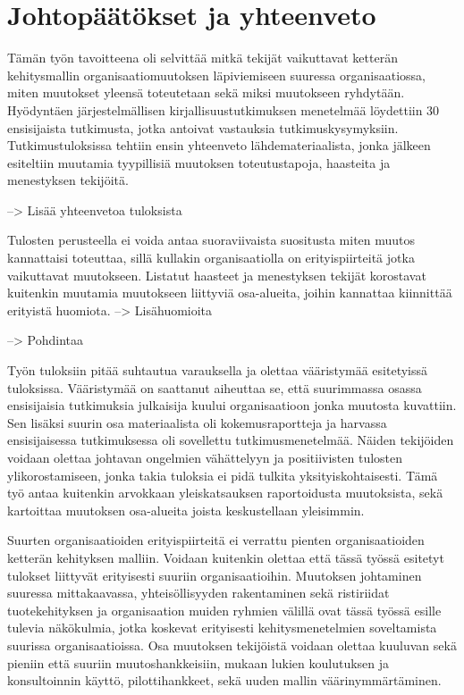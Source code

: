 \clearpage
\section{Johtopäätökset ja yhteenveto}
\label{sec:johtopaatokset}

Tämän työn tavoitteena oli selvittää mitkä tekijät vaikuttavat ketterän
kehitysmallin organisaatiomuutoksen läpiviemiseen suuressa organisaatiossa,
miten muutokset yleensä toteutetaan sekä miksi muutokseen ryhdytään. Hyödyntäen
järjestelmällisen kirjallisuustutkimuksen menetelmää löydettiin 30 ensisijaista
tutkimusta, jotka antoivat vastauksia tutkimuskysymyksiin. Tutkimustuloksissa
tehtiin ensin yhteenveto lähdemateriaalista, jonka jälkeen esiteltiin muutamia
tyypillisiä muutoksen toteutustapoja, haasteita ja menestyksen tekijöitä.

--> Lisää yhteenvetoa tuloksista

Tulosten perusteella ei voida antaa suoraviivaista suositusta miten muutos
kannattaisi toteuttaa, sillä kullakin organisaatiolla on erityispiirteitä jotka
vaikuttavat muutokseen. Listatut haasteet ja menestyksen tekijät korostavat
kuitenkin muutamia muutokseen liittyviä osa-alueita, joihin kannattaa kiinnittää
erityistä huomiota.
--> Lisähuomioita

--> Pohdintaa

Työn tuloksiin pitää suhtautua varauksella ja olettaa vääristymää esitetyissä
tuloksissa. Vääristymää on saattanut aiheuttaa se, että suurimmassa osassa
ensisijaisia tutkimuksia julkaisija kuului organisaatioon jonka muutosta
kuvattiin. Sen lisäksi suurin osa materiaalista oli kokemusraportteja ja
harvassa ensisijaisessa tutkimuksessa oli sovellettu tutkimusmenetelmää. Näiden
tekijöiden voidaan olettaa johtavan ongelmien vähättelyyn ja positiivisten
tulosten ylikorostamiseen, jonka takia tuloksia ei pidä tulkita
yksityiskohtaisesti. Tämä työ antaa kuitenkin arvokkaan yleiskatsauksen
raportoidusta muutoksista, sekä kartoittaa muutoksen osa-alueita joista
keskustellaan yleisimmin.

Suurten organisaatioiden erityispiirteitä ei verrattu pienten organisaatioiden
ketterän kehityksen malliin. Voidaan kuitenkin olettaa että tässä työssä
esitetyt tulokset liittyvät erityisesti suuriin organisaatioihin. Muutoksen
johtaminen suuressa mittakaavassa, yhteisöllisyyden rakentaminen sekä
ristiriidat tuotekehityksen ja organisaation muiden ryhmien välillä ovat tässä
työssä esille tulevia näkökulmia, jotka koskevat erityisesti kehitysmenetelmien
soveltamista suurissa organisaatioissa. Osa muutoksen tekijöistä voidaan olettaa
kuuluvan sekä pieniin että suuriin muutoshankkeisiin, mukaan lukien koulutuksen
ja konsultoinnin käyttö, pilottihankkeet, sekä uuden mallin väärinymmärtäminen.

